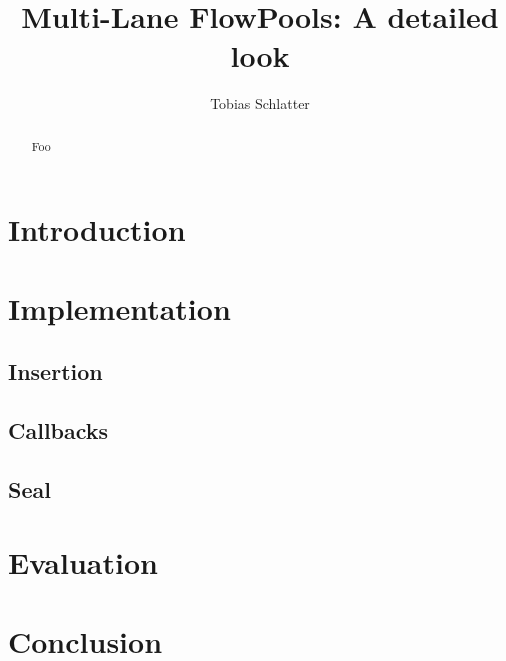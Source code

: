 \documentclass[runningheads,a4paper]{llncs}
\begin{document}
\title{Multi-Lane FlowPools: A detailed look}
\author{Tobias Schlatter}



\maketitle

\begin{abstract}
  Foo
\end{abstract}

\section{Introduction}

\section{Implementation}

\subsection{Insertion}

\subsection{Callbacks}

\subsection{Seal}

\section{Evaluation}

\section{Conclusion}



\end{document}
